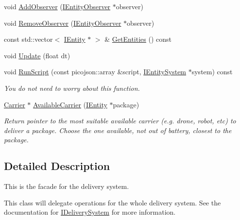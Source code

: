 \begin{DoxyCompactItemize}
\item 
void \hyperlink{classcsci3081_1_1DeliverySimulation_a58859737b937fa7724e7eb0157dced2f}{Add\+Observer} (\hyperlink{classentity__project_1_1IEntityObserver}{I\+Entity\+Observer} $\ast$observer)
\item 
void \hyperlink{classcsci3081_1_1DeliverySimulation_a8ffa78cd68b1d3cc347436f63639431c}{Remove\+Observer} (\hyperlink{classentity__project_1_1IEntityObserver}{I\+Entity\+Observer} $\ast$observer)
\item 
const std\+::vector$<$ \hyperlink{classentity__project_1_1IEntity}{I\+Entity} $\ast$ $>$ \& \hyperlink{classcsci3081_1_1DeliverySimulation_a3d027c435dcc4386da1bf688aae4e21a}{Get\+Entities} () const
\item 
void \hyperlink{classcsci3081_1_1DeliverySimulation_a537740cce3dc15c5ff8266580d1e8f13}{Update} (float dt)
\item 
void \hyperlink{classcsci3081_1_1DeliverySimulation_a332938cb4b972af169ad58dbc1b3bb05}{Run\+Script} (const picojson\+::array \&script, \hyperlink{classentity__project_1_1IEntitySystem}{I\+Entity\+System} $\ast$system) const
\begin{DoxyCompactList}\small\item\em You do not need to worry about this function. \end{DoxyCompactList}\item 
\mbox{\label{classcsci3081_1_1DeliverySimulation_aa5fdc10868678d1198efc458f5040617}} 
\hyperlink{classcsci3081_1_1Carrier}{Carrier} $\ast$ \hyperlink{classcsci3081_1_1DeliverySimulation_aa5fdc10868678d1198efc458f5040617}{Available\+Carrier} (\hyperlink{classentity__project_1_1IEntity}{I\+Entity} $\ast$package)
\begin{DoxyCompactList}\small\item\em Return pointer to the most suitable available carrier (e.\+g. drone, robot, etc) to deliver a package. Choose the one available, not out of battery, closest to the package. \end{DoxyCompactList}\end{DoxyCompactItemize}


\subsection{Detailed Description}
This is the facade for the delivery system. 

This class will delegate operations for the whole delivery system. See the documentation for \hyperlink{classcsci3081_1_1IDeliverySystem}{I\+Delivery\+System} for more information. 

